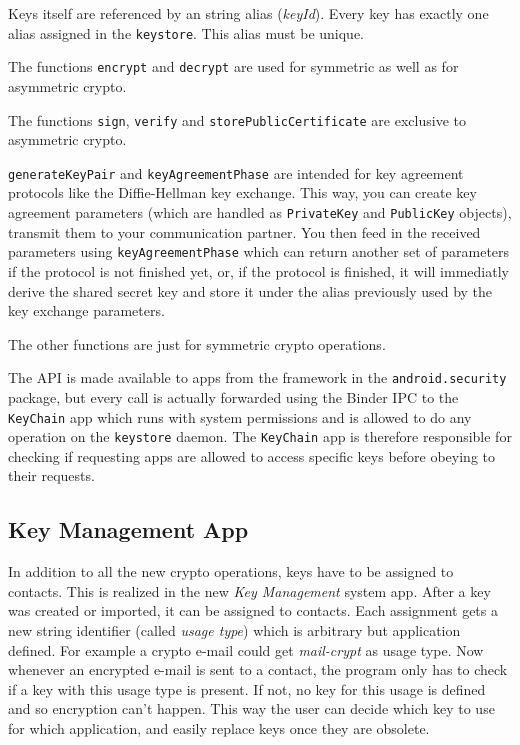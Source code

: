 \documentclass[a4paper,draft]{scrartcl}
\begin{document}
		Keys itself are referenced by an string alias (\emph{keyId}). Every key has exactly one alias assigned in the \texttt{keystore}. This alias must be unique.
	
		The functions \texttt{encrypt} and \texttt{decrypt} are used for symmetric as well as for asymmetric crypto.

		The functions \texttt{sign}, \texttt{verify} and \texttt{storePublicCertificate} are exclusive to asymmetric crypto.

		\texttt{generateKeyPair} and \texttt{keyAgreementPhase} are intended for key agreement protocols like the Diffie-Hellman key exchange. This way, you can create key agreement parameters (which are handled as \texttt{PrivateKey} and \texttt{PublicKey} objects), transmit them to your communication partner. You then feed in the received parameters using \texttt{keyAgreementPhase} which can return another set of parameters if the protocol is not finished yet, or, if the protocol is finished, it will immediatly derive the shared secret key and store it under the alias previously used by the key exchange parameters.

		The other functions are just for symmetric crypto operations.

		The API is made available to apps from the framework in the \texttt{android.security} package, but every call
		is actually forwarded using the Binder IPC to the \texttt{KeyChain} app which runs with system permissions and
		is allowed to do any operation on the \texttt{keystore} daemon. The \texttt{KeyChain} app is therefore responsible
		for checking if requesting apps are allowed to access specific keys before obeying to their requests.
	
	\subsection{Key Management App}
		In addition to all the new crypto operations, keys have to be assigned to contacts. This is realized in the new {\em Key Management} system app. After a key was created or imported, it can be assigned to contacts. Each assignment gets a new string identifier (called {\em usage type}) which is arbitrary but application defined. For example a crypto e-mail could get \textit{mail-crypt} as usage type. Now whenever an encrypted e-mail is sent to a contact, the program only has to check if a key with this usage type is present. If not, no key for this usage is defined and so encryption can't happen. This way the user can decide which key to use for which application, and easily replace keys once they are obsolete.
		
\end{document}
